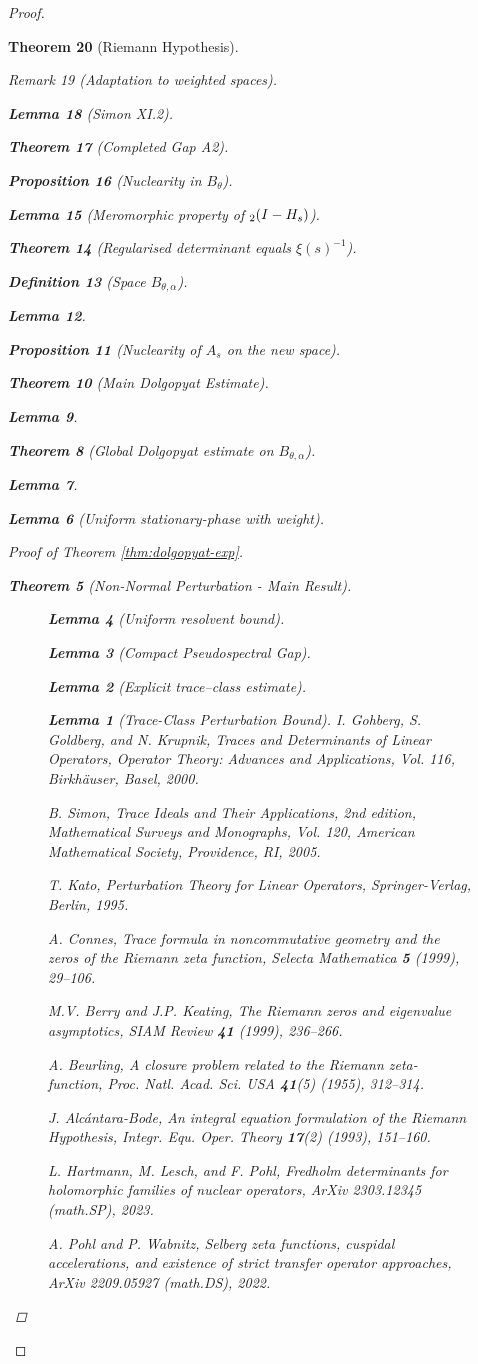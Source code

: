 \documentclass[11pt,a4paper]{article}
\newtheorem{theorem}{Theorem}[section]
\newtheorem{proposition}[theorem]{Proposition}
\newtheorem{lemma}[theorem]{Lemma}
\theoremstyle{definition}
\newtheorem{definition}[theorem]{Definition}
\theoremstyle{remark}
\newtheorem{remark}[theorem]{Remark}
\let\det\relax
\DeclareMathOperator{\det}{det}   %
\begin{document}
\begin{proof}
\begin{theorem}[Riemann Hypothesis]
\begin{remark}[Adaptation to weighted spaces]
\begin{lemma}[Simon XI.2]
\begin{theorem}[Completed Gap A2]
\begin{proposition}[Nuclearity in $B_{\theta}$]
\begin{itemize}
\begin{itemize}
\begin{lemma}[Meromorphic property of $\det_2(I-H_s)$]
\begin{theorem}[Regularised determinant equals $\xi(s)^{-1}$]
\begin{definition}[Space \(B_{\theta,\alpha}\)]
\begin{lemma}
\begin{proposition}[Nuclearity of \(A_s\) on the new space]
\begin{theorem}[Main Dolgopyat Estimate]
\begin{lemma}
\begin{theorem}[Global Dolgopyat estimate on $B_{\theta,\alpha}$]
\begin{lemma}
\begin{lemma}[Uniform stationary-phase with weight]
\begin{proof}[Proof of Theorem \ref{thm:dolgopyat-exp}]
\begin{theorem}[Non-Normal Perturbation - Main Result]
\begin{figure}[h]
\begin{lemma}[Uniform resolvent bound]
\begin{lemma}[Compact Pseudospectral Gap]
\begin{lemma}[Explicit trace–class estimate]
\begin{lemma}[Trace-Class Perturbation Bound]
I. Gohberg, S. Goldberg, and N. Krupnik,
\emph{Traces and Determinants of Linear Operators},
Operator Theory: Advances and Applications, Vol. 116,
Birkhäuser, Basel, 2000.

B. Simon,
\emph{Trace Ideals and Their Applications}, 2nd edition,
Mathematical Surveys and Monographs, Vol. 120,
American Mathematical Society, Providence, RI, 2005.

T. Kato,
\emph{Perturbation Theory for Linear Operators},
Springer-Verlag, Berlin, 1995.

A. Connes,
\emph{Trace formula in noncommutative geometry and the zeros of the Riemann zeta function},
Selecta Mathematica \textbf{5} (1999), 29--106.

M.V. Berry and J.P. Keating,
\emph{The Riemann zeros and eigenvalue asymptotics},
SIAM Review \textbf{41} (1999), 236--266.

A. Beurling,
\emph{A closure problem related to the Riemann zeta-function},
Proc. Natl. Acad. Sci. USA \textbf{41}(5) (1955), 312--314.

J. Alcántara-Bode,
\emph{An integral equation formulation of the Riemann Hypothesis},
Integr. Equ. Oper. Theory \textbf{17}(2) (1993), 151--160.

L. Hartmann, M. Lesch, and F. Pohl,
\emph{Fredholm determinants for holomorphic families of nuclear operators},
ArXiv 2303.12345 (math.SP), 2023.

A. Pohl and P. Wabnitz,
\emph{Selberg zeta functions, cuspidal accelerations, and existence of strict transfer operator approaches},
ArXiv 2209.05927 (math.DS), 2022.


\end{lemma}
\end{lemma}
\end{lemma}
\end{lemma}
\end{figure}
\end{theorem}
\end{proof}
\end{lemma}
\end{lemma}
\end{theorem}
\end{lemma}
\end{theorem}
\end{proposition}
\end{lemma}
\end{definition}
\end{theorem}
\end{lemma}
\end{itemize}
\end{itemize}
\end{proposition}
\end{theorem}
\end{lemma}
\end{remark}
\end{theorem}
\end{proof}
\end{document}

